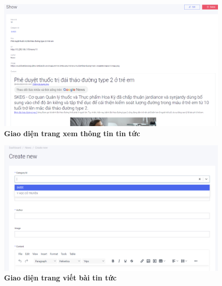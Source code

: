 \begin{figure}[H]
  \centering
  \includegraphics[scale=0.5]{Images/server/webUI/news_show.PNG}
  \caption[Giao diện trang xem thông tin tin tức]{\bfseries \fontsize{12pt}{0pt}\selectfont Giao diện trang xem thông tin tin tức}
  \label{news_show} %
\end{figure}

\begin{figure}[H]
  \centering
  \includegraphics[scale=0.5]{Images/server/webUI/news_create.png}
  \caption[Giao diện trang viết bài tin tức]{\bfseries \fontsize{12pt}{0pt}\selectfont Giao diện trang viết bài tin tức}
  \label{news_create} %
\end{figure}


